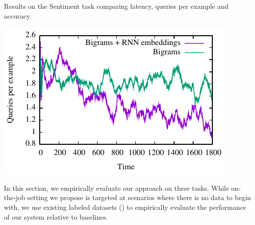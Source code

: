 \begin{table}[t]
    \begin{minipage}[t]{.49\textwidth }
        
        \caption{Results on the Sentiment task comparing latency, queries per example and accuracy.}
        \label{tbl:sentiment-results}
        \vfill
    \end{minipage}%
    \begin{minipage}[t]{.49\textwidth}
  \includegraphics[width=\textwidth]{figures/sentiment_cost_per_token_vs_time/cost_per_token_vs_time.pdf}
        \label{fig:sentiment-tradeoff}
    \end{minipage}
\end{table}


In this section, we empirically evaluate our approach on three tasks. 
While on-the-job setting we propose is targeted at scenarios where there is no data to begin with, we use existing labeled datasets () to empirically evaluate the performance of our system relative to baselines.

